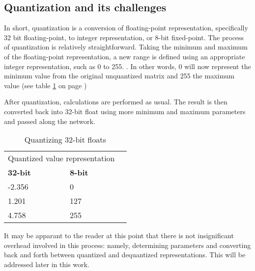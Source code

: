 \subsection{Quantization and its challenges}
In short, quantization is a conversion of floating-point representation, specifically 32 bit floating-point, to integer representation, or 8-bit fixed-point. The process of quantization is relatively straightforward. Taking the minimum and maximum of the floating-point representation, a new range is defined using an appropriate integer representation, such as 0 to 255. \cite{warden_quantize}. In other words, 0 will now represent the minimum value from the original unquantized matrix and 255 the maximum value (see table \ref{tbl:quantize} on page \pageref{tbl:quantize})

After quantization, calculations are performed as usual. The result is then converted back into 32-bit float using more minimum and maximum parameters and passed along the network.

\begin{table}[]
\centering
\caption{Quantizing 32-bit floats}
\label{tbl:quantize}
\begin{tabular}{|l|l|l}
\cline{1-2}
\multicolumn{2}{|l|}{Quantized value representation} &  \\ \cline{1-2}
\textbf{32-bit}           & \textbf{8-bit}           &  \\ \cline{1-2}
-2.356                    & 0                        &  \\ \cline{1-2}
1.201                     & 127                      &  \\ \cline{1-2}
4.758                     & 255                      &  \\ \cline{1-2}
\end{tabular}
\end{table}

It may be apparant to the reader at this point that there is not insignificant overhead involved in this process: namely, determining parameters and converting back and forth between quantized and dequantized representations. This will be addressed later in this work.